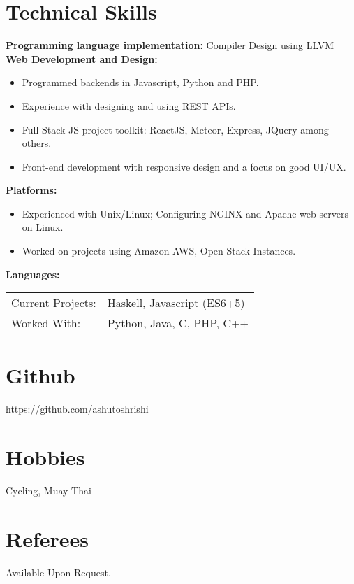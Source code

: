 \documentclass[overlapped]{res}
\begin{document}
\begin{resume}
  \section{Technical Skills} 
  \textbf{Programming language implementation:} Compiler Design using LLVM \\
  \textbf{Web Development and Design:}
  \begin{itemize}
  \item Programmed backends in Javascript, Python and PHP.
  \item Experience with designing and using REST APIs.
  \item Full Stack JS project toolkit: ReactJS, Meteor, Express, JQuery among 
    others.
  \item Front-end development with responsive design and a focus on good UI/UX.
  \end{itemize}
  \textbf{Platforms:}
  \begin{itemize}
  \item Experienced with Unix/Linux; Configuring NGINX and Apache web servers on
    Linux.
  \item Worked on projects using Amazon AWS, Open Stack Instances. 
  \end{itemize}
  \textbf{Languages:} \\ 
  \begin{tabular}{l l}
    Current Projects: & Haskell, Javascript (ES6+5) \\ 
    Worked With: & Python, Java, C, PHP, C++
  \end{tabular}


  \section{Github} 
  https://github.com/ashutoshrishi 
  \section{Hobbies}
  Cycling, Muay Thai
  
  \section{Referees}
  Available Upon Request.
  
  
\end{resume}
\end{document}
